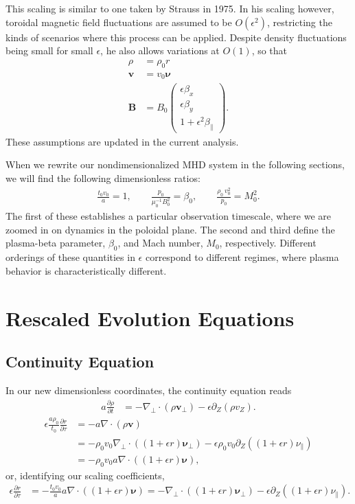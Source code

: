 \documentclass{article}
\newcommand{\para}{\parallel}
\newcommand{\ep}{\epsilon}
\newcommand{\np}{\nabla_\perp}
\newcommand{\p}{\partial}
\newcommand{\deriv}[2]{\frac{\p #1}{\p #2}}
\newcommand{\pth} [1] {\left( #1 \right) }
\newcommand{\pmat} [1] {\begin{pmatrix} #1 \end{pmatrix}}
\begin{document}
This scaling is similar to one taken by Strauss in 1975. In his scaling however, toroidal magnetic field fluctuations are assumed to be $O\pth{\ep^2}$, restricting the kinds of scenarios where this process can be applied. Despite density fluctuations being small for small $\ep$, he also allows variations at $O(1)$, so that 
\begin{align*}
    \rho &= \rho_0 r \\
    \bm{v} &= v_0 \bm{\nu} \\ 
    \bm{B} &= B_0 \pmat{\ep\beta_x \\ \ep\beta_y \\ 1+\ep^2\beta_\para}.
\end{align*}
These assumptions are updated in the current analysis. 

When we rewrite our nondimensionalized MHD system in the following sections, we will find the following dimensionless ratios:  
\begin{align*}
    \frac{t_0 v_0}{a} = 1, \qquad 
    \frac{p_0}{\mu_0^{-1}B_0^2} = \beta_0, \qquad 
    \frac{\rho_0\,v_0^2}{p_0} = M_0^2. 
\end{align*}
The first of these establishes a particular observation timescale, where we are zoomed in on dynamics in the poloidal plane. The second and third define the plasma-beta parameter, $\beta_0$, and Mach number, $M_0$, respectively. Different orderings of these quantities in $\ep$ correspond to different regimes, where plasma behavior is characteristically different. 


\section{Rescaled Evolution Equations}
\subsection{Continuity Equation}
In our new dimensionless coordinates, the continuity equation reads
\begin{align*}
    a\deriv{\rho}{t} &= -\np\cdot\pth{\rho\bm{v}_\perp} - \ep\p_Z\pth{\rho v_Z}. 
\end{align*}
\begin{align*}
    \ep\frac{a\rho_0}{t_0}\deriv{r}{\tau} &= -a\nabla\cdot\pth{\rho\bm{v}} \\ 
    &= -\rho_0v_0\np\cdot\pth{\pth{1+\ep r}\bm{\nu}_\perp} - \ep\rho_0v_0 \p_Z\pth{\pth{1+\ep r}\nu_\para} \\ 
    &= -\rho_0v_0 a\nabla\cdot\pth{\pth{1+\ep r} \bm{\nu}}, 
\end{align*}
or, identifying our scaling coefficients, 
\begin{align*} 
    \ep\deriv{r}{\tau} &= -\frac{t_0v_0}{a} a\nabla\cdot\pth{\pth{1+\ep r}\bm{\nu}}
    = -\np\cdot\pth{\pth{1+\ep r}\bm{\nu}_\perp} - \ep\p_Z\pth{\pth{1+\ep r}\nu_\para}. 
\end{align*}
\end{document}

